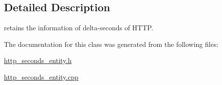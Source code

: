 \subsection{Detailed Description}
retains the information of delta-\/seconds of H\-T\-T\-P. 

The documentation for this class was generated from the following files\-:\begin{DoxyCompactItemize}
\item 
\hyperlink{http__seconds__entity_8h}{http\-\_\-seconds\-\_\-entity.\-h}\item 
\hyperlink{http__seconds__entity_8cpp}{http\-\_\-seconds\-\_\-entity.\-cpp}\end{DoxyCompactItemize}
